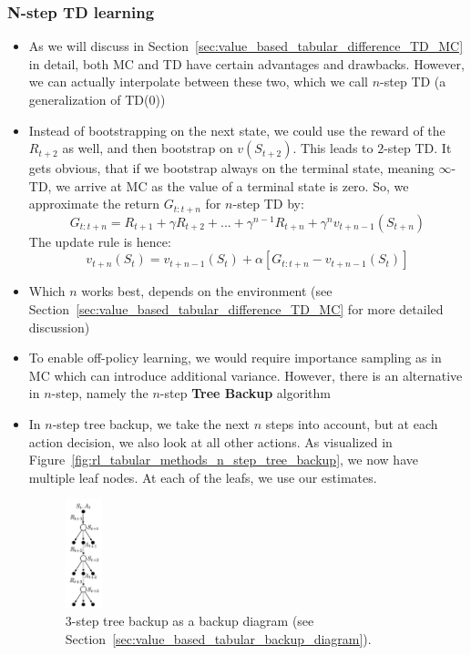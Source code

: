 \subsubsection{N-step TD learning}
\begin{itemize}
	\item As we will discuss in Section~\ref{sec:value_based_tabular_difference_TD_MC} in detail, both MC and TD have certain advantages and drawbacks. However, we can actually interpolate between these two, which we call $n$-step TD (a generalization of TD(0))
	\item Instead of bootstrapping on the next state, we could use the reward of the $R_{t+2}$ as well, and then bootstrap on $v(S_{t+2})$. This leads to $2$-step TD. It gets obvious, that if we bootstrap always on the terminal state, meaning $\infty$-TD, we arrive at MC as the value of a terminal state is zero. So, we approximate the return $G_{t:t+n}$ for $n$-step TD by:
	$$G_{t:t+n} = R_{t+1}+\gamma R_{t+2} + ... + \gamma^{n-1}R_{t+n} + \gamma^n v_{t+n-1}(S_{t+n})$$
	The update rule is hence:
	$$v_{t+n}(S_t) = v_{t+n-1}(S_t) + \alpha \left[G_{t:t+n}- v_{t+n-1}(S_t)\right]$$
	\item Which $n$ works best, depends on the environment (see Section~\ref{sec:value_based_tabular_difference_TD_MC} for more detailed discussion)
	\item To enable off-policy learning, we would require importance sampling as in MC which can introduce additional variance. However, there is an alternative in $n$-step, namely the $n$-step \textbf{Tree Backup} algorithm
	\item In $n$-step tree backup, we take the next $n$ steps into account, but at each action decision, we also look at all other actions. As visualized in Figure~\ref{fig:rl_tabular_methods_n_step_tree_backup}, we now have multiple leaf nodes. At each of the leafs, we use our estimates.
	\begin{figure}[ht!]
		\centering
		\includegraphics[width=0.1\textwidth]{figures/rl_tabular_methods_n_step_tree_backup.png}
		\caption{3-step tree backup as a backup diagram (see Section~\ref{sec:value_based_tabular_backup_diagram}).}

\end{figure}
\end{itemize}
